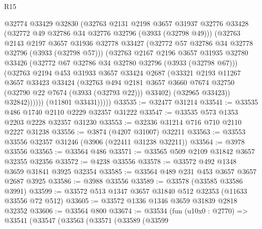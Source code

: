 \begin{lexlean}{R15}
\begin{coremodule}
                @32774
                @33429
                @32830
                (@32763
                  @2131
                  @2198
                  @3657
                  @31937
                  @32776
                  @33428
                  (@32772 @49 @32786 @34 @32776 @32796 (@3933 (@32798 @49)))
                  (@32763
                    @2143
                    @2197
                    @3657
                    @31936
                    @32778
                    @33427
                    (@32772 @57 @32786 @34 @32778 @32796 (@3933 (@32798 @57)))
                    (@32763
                      @2167
                      @2196
                      @3657
                      @31935
                      @32780
                      @33426
                      (@32772 @67 @32786 @34 @32780 @32796 (@3933 (@32798 @67)))
                      (@32763
                        @2194
                        @453
                        @31933
                        @3657
                        @33424
                        @2687
                        (@33321
                          @2193
                          @11267
                          @3657
                          @33423
                          @33424
                          (@32763
                            @494
                            @2181
                            @3657
                            @3660
                            @7674
                            @32750
                            (@32790 @22 @7674 (@3933 (@32793 @22)))
                            @33402)
                          (@32965 @33423))
                        @32842))))))
            (@11801 @33431)))))
@33535 := @32477 @31214
@33541 := @33535 @486 @1740 @2110 @2229 @32357 @31222
@33547 := @33535 @573 @1353 @2203 @2228 @32357 @31230
@33553 := @32336 @31214 @716 @710 @2110 @2227 @31238
@33556 := @3874 (@4207 @31007) @32211
@33563 := @33553 @33556 @32357 @31246 (@3906 (@22411 @31238 @32211))
@33564 := @3978 @33556
@33565 := @33564 @486
@33571 := @33565 @509 @2109 @31842 @3657 @32355 @32356
@33572 := @4238 @33556
@33578 := @33572 @492 @1348 @3659 @31841 @3925 @32354
@33585 := @33564 @489 @231 @453 @3657 @3657 @2687 @3925
@33586 := @3988 @33556
@33589 := @33578 (@33585 @33586 @3991)
@33599 := @33572 @513 @1347 @3657 @31840 @512 @32353 (@11633 @33556 @72 @512)
@33605 := @33572 @1336 @1346 @3659 @31839 @2818 @32352
@33606 := @33564 @800
@33674 := @33534
    (fun (u10x0 : @2770) =>
    @33541
      (@33547
        (@33563
          (@33571
            (@33589
              (@33599

\end{coremodule}
\end{lexlean}
